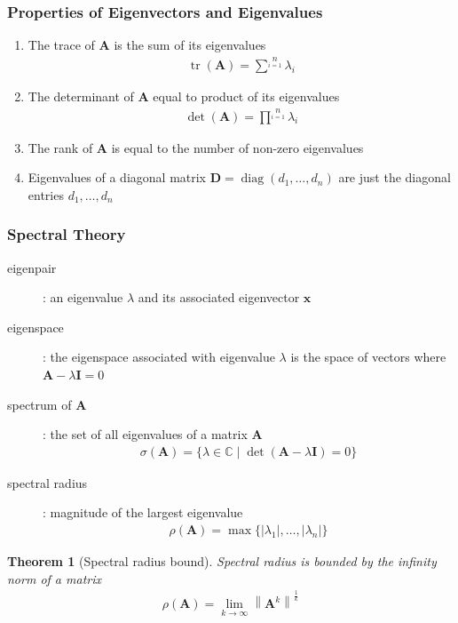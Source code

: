 \documentclass[letterpaper,12pt]{article}
\newcommand{\vect}[1]{\mathbf{#1}}
\newcommand{\matr}[1]{\mathbf{#1}}
\newcommand{\norm}[1]{\left\lVert#1\right\rVert}
\newcommand{\abs}[1]{\lvert#1\rvert}
\DeclareMathOperator{\tr}{tr}
\DeclareMathOperator{\diag}{diag}
\newtheorem{thm}{Theorem}
\begin{document}
\subsubsection{Properties of Eigenvectors and Eigenvalues}
\begin{enumerate}
 \item The trace of $\matr{A}$ is the sum of its eigenvalues
       \begin{align}
        \tr(\matr{A}) = \sum\limits^{n}\limits_{i=1} \lambda_i
       \end{align}
 \item The determinant of $\matr{A}$ equal to product of its eigenvalues
       \begin{align}
        \det(\matr{A}) = \prod\limits^{n}\limits_{i=1} \lambda_i
       \end{align}
 \item The rank of $\matr{A}$ is equal to the number of non-zero eigenvalues
 \item Eigenvalues of a diagonal matrix $\matr{D} = \diag(d_1, \dots, d_n)$ are just the diagonal entries $d_1, \dots, d_n$
\end{enumerate}

\subsubsection{Spectral Theory}
\begin{description}
 \item[eigenpair]: an eigenvalue $\lambda$ and its associated eigenvector $\vect{x}$
 \item[eigenspace]: the eigenspace associated with eigenvalue $\lambda$ is the space of vectors where $\matr{A} -\lambda\matr{I} = 0$
 \item[spectrum of $\matr{A}$]: the set of all eigenvalues of a matrix $\matr{A}$
       \begin{align}
        \sigma(\matr{A}) = \{\lambda \in \mathbb{C} \mid \det(\matr{A} - \lambda\matr{I})=0 \}
       \end{align}
 \item[spectral radius]: magnitude of the largest eigenvalue
       \begin{align}
        \rho(\matr{A}) = \max \{ \abs{\lambda_1}, \dots, \abs{\lambda_n} \}
       \end{align}
\end{description}

\begin{thm}[Spectral radius bound]
 Spectral radius is bounded by the infinity norm of a matrix
 \begin{align}
  \rho(\matr{A}) = \lim_{k \to \infty} \norm{\matr{A}^k}^{\frac{1}{k}}
 \end{align}
\end{thm}
\end{document}
